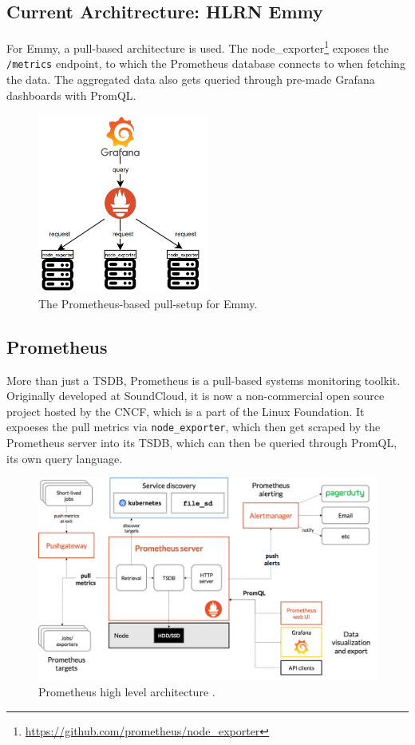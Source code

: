 \subsection{Current Architrecture: HLRN Emmy}
For Emmy, a pull-based architecture is used. The node\_exporter\footnote{
\url{https://github.com/prometheus/node_exporter}} exposes the \texttt{/metrics} endpoint, to which
the Prometheus database connects to when fetching the data. The aggregated data also gets queried
through pre-made Grafana dashboards with PromQL.

\begin{figure}[H]
  \centering
  \includegraphics[width=0.5\textwidth]{./assets/prometheus.jpeg}
  \caption{The Prometheus-based pull-setup for Emmy.}
\end{figure}

\subsection{Prometheus}
More than just a \ac{TSDB}, Prometheus is a pull-based systems monitoring toolkit. Originally 
developed at SoundCloud, it is now a non-commercial open source project hosted by the \ac{CNCF},
which is a part of the Linux Foundation. It expoeses the pull metrics via \texttt{node\_exporter},
which then get scraped by the Prometheus server into its \ac{TSDB}, which can then be queried through
PromQL, its own query language.

\begin{figure}[H]
  \centering
  \includegraphics[width=\textwidth]{./assets/promarch.png}
  \caption{Prometheus high level architecture \cite{promarch}.}
\end{figure}

